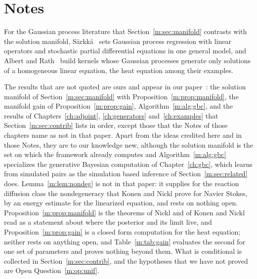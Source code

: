\section*{Notes}

For the Gaussian process literature that Section~\ref{m:sec:manifold} contrasts with the solution manifold, S\"arkk\"a~\cite{sarkka2011} sets Gaussian process regression with linear operators and stochastic partial differential equations in one general model, and Albert and Rath~\cite{albertrath2020} build kernels whose Gaussian processes generate only solutions of a homogeneous linear equation, the heat equation among their examples.

The results that are not quoted are ours and appear in our paper~\cite{polsonsokolov2026manifold}: the solution manifold of Section~\ref{m:sec:manifold} with Proposition~\ref{m:prop:manifold}, the manifold gain of Proposition~\ref{m:prop:gain}, Algorithm~\ref{m:alg:gbc}, and the results of Chapters~\ref{ch:adjoint}, \ref{ch:generators} and~\ref{ch:examples} that Section~\ref{m:sec:contrib} lists in order, except those that the Notes of those chapters name as not in that paper. Apart from the ideas credited here and in those Notes, they are to our knowledge new, although the solution manifold is the set on which the framework already computes and Algorithm~\ref{m:alg:gbc} specializes the generative Bayesian computation of Chapter~\ref{ch:gbc}, which learns from simulated pairs as the simulation based inference of Section~\ref{m:sec:related} does. Lemma~\ref{m:lem:nondeg} is not in that paper: it supplies for the reaction diffusion class the nondegeneracy that Konen and Nickl prove for Navier Stokes, by an energy estimate for the linearized equation, and rests on nothing open. Proposition~\ref{m:prop:manifold} is the theorems of Nickl and of Konen and Nickl read as a statement about where the posterior and its limit live, and Proposition~\ref{m:prop:gain} is a closed form computation for the heat equation; neither rests on anything open, and Table~\ref{m:tab:gain} evaluates the second for one set of parameters and proves nothing beyond them. What is conditional is collected in Section~\ref{m:sec:contrib}, and the hypotheses that we have not proved are Open Question~\ref{m:op:unif}.
